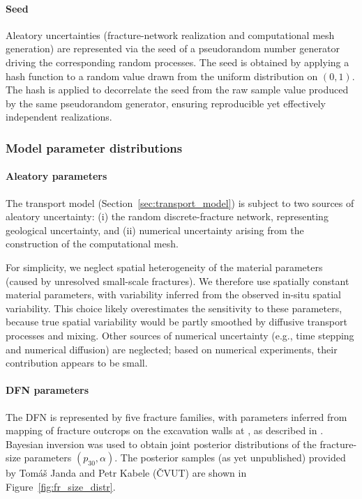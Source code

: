 \paragraph{Seed}
Aleatory uncertainties (fracture-network realization and computational mesh generation) are represented via the seed of a
pseudorandom number generator driving the corresponding random processes.
The seed is obtained by applying a hash function to a random value drawn from the uniform distribution on $(0,1)$.
The hash is applied to decorrelate the seed from the raw sample value produced by the same pseudorandom generator, ensuring reproducible yet effectively independent realizations.


\subsubsection{Model parameter distributions}

\paragraph{Aleatory parameters}
The transport model (Section~\ref{sec:transport_model}) is subject to two sources of aleatory uncertainty:
(i) the random discrete-fracture network, representing geological uncertainty, and
(ii) numerical uncertainty arising from the construction of the computational mesh.

For simplicity, we neglect spatial heterogeneity of the material parameters (caused by unresolved small-scale fractures). We therefore use spatially constant material parameters, with variability inferred from the observed in-situ spatial variability. This choice likely overestimates the sensitivity to these parameters, because true spatial variability would be partly smoothed by diffusive transport processes and mixing. Other sources of numerical uncertainty (e.g., time stepping and numerical diffusion) are neglected; based on numerical experiments, their contribution appears to be small.


\paragraph{DFN parameters}
The DFN is represented by five fracture families, with parameters inferred from mapping of fracture outcrops on the excavation walls at \URFB, as described in \cite{ZunaEtal2024FractureConnectivityBukovURF}.
Bayesian inversion was used to obtain joint posterior distributions of the fracture-size parameters $(p_{30}, \alpha)$.
The posterior samples (as yet unpublished) provided by Tomáš Janda and Petr Kabele (ČVUT) are shown in Figure~\ref{fig:fr_size_distr}.

